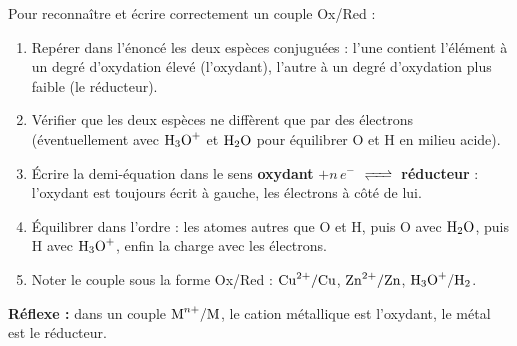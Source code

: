 \documentclass[11pt]{article}
\newcommand{\cle}[1]{{\popxbold\color{popdark}#1}}
\begin{document}
\begin{methode}
Pour reconnaître et écrire correctement un couple Ox/Red :
\begin{enumerate}
\item Repérer dans l'énoncé les deux espèces conjuguées : l'une contient l'élément à un degré d'oxydation élevé (l'\cle{oxydant}), l'autre à un degré d'oxydation plus faible (le \cle{réducteur}).
\item Vérifier que les deux espèces ne diffèrent que par des électrons (éventuellement avec $\ce{H3O+}$ et $\ce{H2O}$ pour équilibrer O et H en milieu acide).
\item Écrire la demi-équation dans le sens \textbf{oxydant} $+ n\,e^-$ $\ce{<=>}$ \textbf{réducteur} : l'oxydant est toujours écrit à gauche, les électrons à côté de lui.
\item Équilibrer dans l'ordre : les atomes autres que O et H, puis O avec $\ce{H2O}$, puis H avec $\ce{H3O+}$, enfin la charge avec les électrons.
\item Noter le couple sous la forme Ox/Red : $\ce{Cu^2+}/\ce{Cu}$, $\ce{Zn^2+}/\ce{Zn}$, $\ce{H3O+}/\ce{H2}$.
\end{enumerate}
\textbf{Réflexe :} dans un couple $\ce{M^{n+}}/\ce{M}$, le cation métallique est l'oxydant, le métal est le réducteur.
\end{methode}
\end{document}
